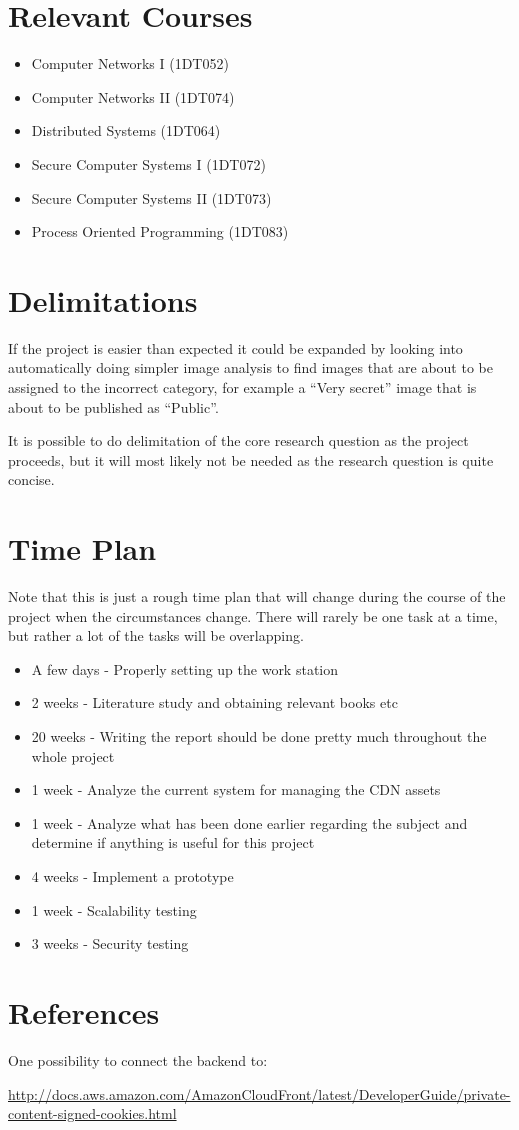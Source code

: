 \documentclass[a4paper,12pt]{article}
\begin{document}
\section{Relevant Courses}
\begin{itemize}
  \item Computer Networks I (1DT052)
  \item Computer Networks II (1DT074)
  \item Distributed Systems (1DT064)
  \item Secure Computer Systems I (1DT072)
  \item Secure Computer Systems II (1DT073)
  \item Process Oriented Programming (1DT083)
\end{itemize}

\section{Delimitations}
If the project is easier than expected it could be expanded by looking into 
automatically doing simpler image analysis to find images that are about to 
be assigned to the incorrect category, for example a ``Very secret'' image 
that is about to be published as ``Public''.

It is possible to do delimitation of the core research question as the project 
proceeds, but it will most likely not be needed as the research question is 
quite concise.

\section{Time Plan}
Note that this is just a rough time plan that will change during the course of 
the project when the circumstances change.
There will rarely be one task at a time, but rather a lot of the tasks will be 
overlapping.
\begin{itemize}
  \item A few days - Properly setting up the work station
  \item 2 weeks - Literature study and obtaining relevant books etc
  \item 20 weeks - Writing the report should be done pretty much 
  throughout the whole project
  \item 1 week - Analyze the current system for managing the CDN assets
  \item 1 week - Analyze what has been done earlier regarding the 
  subject and determine if anything is useful for this project
  \item 4 weeks - Implement a prototype
  \item 1 week - Scalability testing
  \item 3 weeks - Security testing
\end{itemize}

\section{References}
One possibility to connect the backend to:

\url{http://docs.aws.amazon.com/AmazonCloudFront/latest/DeveloperGuide/private-content-signed-cookies.html}
\end{document}
